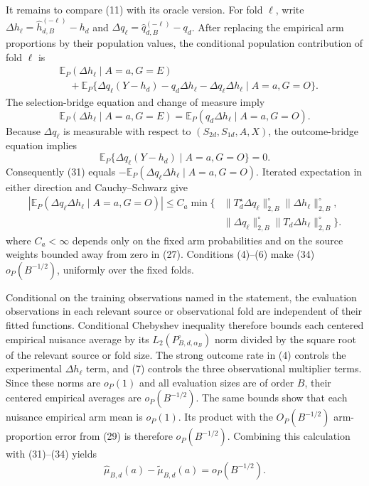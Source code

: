 It remains to compare (11) with its oracle version.  For fold \(\ell\), write \(\Delta h_\ell=\widehat h_{d,B}^{(-\ell)}-h_d\) and \(\Delta q_\ell=\widehat q_{d,B}^{(-\ell)}-q_d\).  After replacing the empirical arm proportions by their population values, the conditional population contribution of fold \(\ell\) is
\[
\begin{aligned}
 &\mathbb E_P(\Delta h_\ell\mid A=a,G=E)\\
 &\quad+\mathbb E_P\{\Delta q_\ell(Y-h_d)-q_d\Delta h_\ell
                -\Delta q_\ell\Delta h_\ell\mid A=a,G=O\}.
\end{aligned}                                                \tag{31}
\]
The selection-bridge equation and change of measure imply
\[
 \mathbb E_P(\Delta h_\ell\mid A=a,G=E)
 =\mathbb E_P(q_d\Delta h_\ell\mid A=a,G=O).                \tag{32}
\]
Because \(\Delta q_\ell\) is measurable with respect to \((S_{2d},S_{1d},A,X)\), the outcome-bridge equation implies
\[
 \mathbb E_P\{\Delta q_\ell(Y-h_d)\mid A=a,G=O\}=0.         \tag{33}
\]
Consequently (31) equals \(-\mathbb E_P(\Delta q_\ell\Delta h_\ell\mid A=a,G=O)\).  Iterated expectation in either direction and Cauchy--Schwarz give
\[
\begin{aligned}
 |\mathbb E_P(\Delta q_\ell\Delta h_\ell\mid A=a,G=O)|
 \le C_a\min\{&
 \|T_d^\star\Delta q_\ell\|_{2,B}^{\circ}
 \|\Delta h_\ell\|_{2,B}^{\circ},\\
 &\|\Delta q_\ell\|_{2,B}^{\circ}
 \|T_d\Delta h_\ell\|_{2,B}^{\circ}\}.
\end{aligned}                                                \tag{34}
\]
where \(C_a<\infty\) depends only on the fixed arm probabilities and on the source weights bounded away from zero in (27).  Conditions (4)--(6) make (34) \(o_P(B^{-1/2})\), uniformly over the fixed folds.

Conditional on the training observations named in the statement, the evaluation observations in each relevant source or observational fold are independent of their fitted functions.  Conditional Chebyshev inequality therefore bounds each centered empirical nuisance average by its \(L_2(P_{B,d,\alpha_B}^{\circ})\) norm divided by the square root of the relevant source or fold size.  The strong outcome rate in (4) controls the experimental \(\Delta h_\ell\) term, and (7) controls the three observational multiplier terms.  Since these norms are \(o_P(1)\) and all evaluation sizes are of order \(B\), their centered empirical averages are \(o_P(B^{-1/2})\).  The same bounds show that each nuisance empirical arm mean is \(o_P(1)\).  Its product with the \(O_P(B^{-1/2})\) arm-proportion error from (29) is therefore \(o_P(B^{-1/2})\).  Combining this calculation with (31)--(34) yields
\[
 \widehat\mu_{B,d}(a)-\widetilde\mu_{B,d}(a)=o_P(B^{-1/2}). \tag{35}
\]

